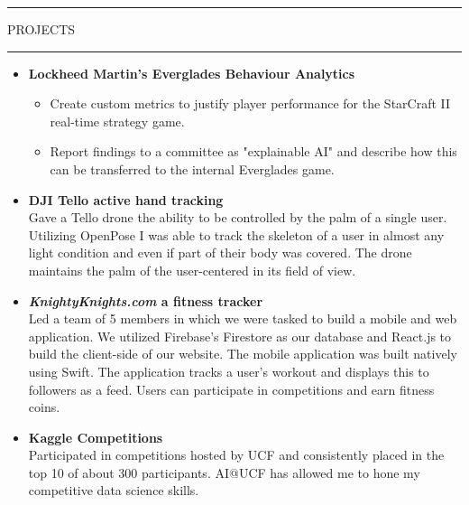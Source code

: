 \documentclass{article}
\newcommand{\makesection}[1]{\hrule\vskip1mm\uppercase{#1}\vskip1mm\hrule}
\begin{document}
\makesection{Projects}
\begin{itemize}[leftmargin=.35cm]
    \item \textbf{Lockheed Martin's Everglades Behaviour Analytics}
    \vspace*{-1.5mm}
    \begin{itemize}[leftmargin=.35cm]
        \item Create custom metrics to justify player performance for the StarCraft II real-time strategy game.
        \item Report findings to a committee as "explainable AI" and describe how this can be transferred to the internal Everglades game.
    \end{itemize}

    \item \textbf{DJI Tello active hand tracking} \\
    Gave a Tello drone the ability to be controlled by the palm of a single user. Utilizing OpenPose I was able to track the skeleton of a user in almost any light condition and even if part of their body was covered. The drone maintains the palm of the user-centered in its field of view.

    \item \textbf{\textit{KnightyKnights.com} a fitness tracker} \\
    Led a team of 5 members in which we were tasked to build a mobile and web application. We utilized Firebase's Firestore as our database and React.js to build the client-side of our website. The mobile application was built natively using Swift. The application tracks a user's workout and displays this to followers as a feed. Users can participate in competitions and earn fitness coins.

    \item \textbf{Kaggle Competitions} \\
    Participated in competitions hosted by UCF and consistently placed in the top 10 of about 300 participants. AI@UCF has allowed me to hone my competitive data science skills.
\end{itemize}
\end{document}
